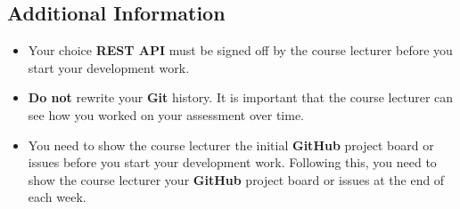 \documentclass{article}
\begin{document}
\subsection*{Additional Information}
\begin{itemize}
	\item Your choice \textbf{REST API} must be signed off by the course lecturer before you start your development work.
    \item \textbf{Do not} rewrite your \textbf{Git} history. It is important that the course lecturer can see how you worked on your assessment over time. 
    \item You need to show the course lecturer the initial \textbf{GitHub} project board or issues before you start your development work. Following this, you need to show the course lecturer your \textbf{GitHub} project board or issues at the end of each week.
\end{itemize} 
\end{document}
